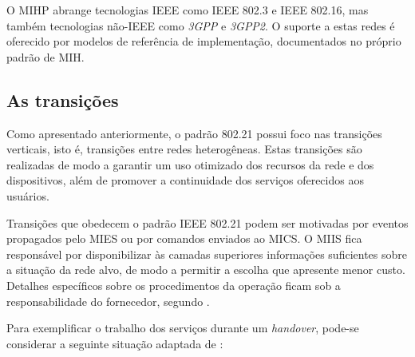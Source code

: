 \documentclass[12pt]{article}
\begin{document}
O MIHP abrange tecnologias IEEE como IEEE 802.3 e IEEE 802.16, mas também 
tecnologias não-IEEE como \textit{3GPP} e \textit{3GPP2}. O suporte a estas 
redes é oferecido por modelos de referência de implementação, documentados no 
próprio padrão de MIH.

\subsection{As transições}

Como apresentado anteriormente, o padrão 802.21 possui foco nas transições 
verticais, isto é, transições entre redes heterogêneas. Estas transições são 
realizadas de modo a garantir um uso otimizado dos recursos da rede e dos 
dispositivos, além de promover a continuidade dos serviços oferecidos aos 
usuários.

Transições que obedecem o padrão IEEE 802.21 podem ser motivadas por eventos 
propagados pelo MIES ou por comandos enviados ao MICS. O MIIS fica responsável 
por disponibilizar às camadas superiores informações suficientes sobre a 
situação da rede alvo, de modo a permitir a escolha que apresente menor custo.  
Detalhes específicos sobre os procedimentos da operação ficam sob a 
responsabilidade do fornecedor, segundo \cite{stein:2006}.

Para exemplificar o trabalho dos serviços durante um \textit{handover}, 
pode-se considerar a seguinte situação adaptada de \cite{kimhun:2010}: 
\end{document}
